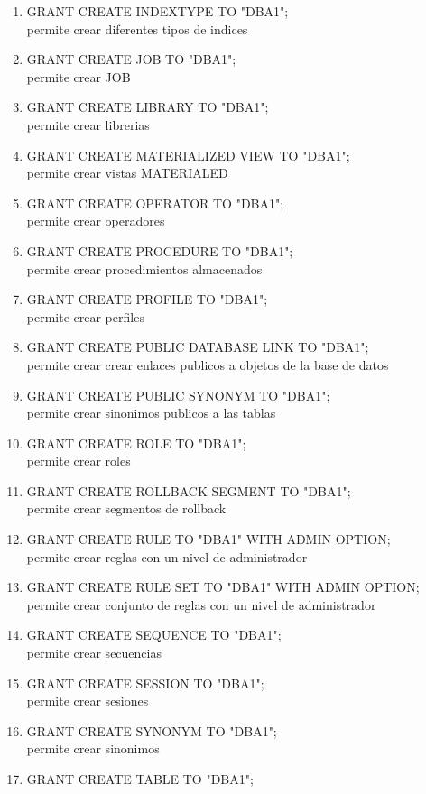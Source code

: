 \begin{enumerate}
\item GRANT CREATE INDEXTYPE TO "DBA1";
\\ permite crear diferentes tipos de indices
\item GRANT CREATE JOB TO "DBA1";
\\ permite crear JOB 
\item GRANT CREATE LIBRARY TO "DBA1";
\\ permite crear librerias
\item GRANT CREATE MATERIALIZED VIEW TO "DBA1";
\\permite crear vistas MATERIALED 
\item GRANT CREATE OPERATOR TO "DBA1";
\\ permite crear operadores
\item GRANT CREATE PROCEDURE TO "DBA1";
\\permite crear procedimientos almacenados
\item GRANT CREATE PROFILE TO "DBA1";
\\permite crear perfiles
\item GRANT CREATE PUBLIC DATABASE LINK TO "DBA1";
\\permite crear crear enlaces publicos a objetos de la base de datos
\item GRANT CREATE PUBLIC SYNONYM TO "DBA1";
\\permite crear sinonimos publicos a las tablas
\item GRANT CREATE ROLE TO "DBA1";
\\permite crear roles
\item GRANT CREATE ROLLBACK SEGMENT TO "DBA1";
\\permite crear segmentos de rollback
\item GRANT CREATE RULE TO "DBA1" WITH ADMIN OPTION;
\\permite crear reglas con un nivel de administrador
\item GRANT CREATE RULE SET TO "DBA1" WITH ADMIN OPTION;
\\permite crear conjunto de reglas con un nivel de administrador
\item GRANT CREATE SEQUENCE TO "DBA1";
\\permite crear secuencias
\item GRANT CREATE SESSION TO "DBA1";
\\permite crear sesiones
\item GRANT CREATE SYNONYM TO "DBA1";
\\permite crear sinonimos
\item GRANT CREATE TABLE TO "DBA1";

\end{enumerate}
